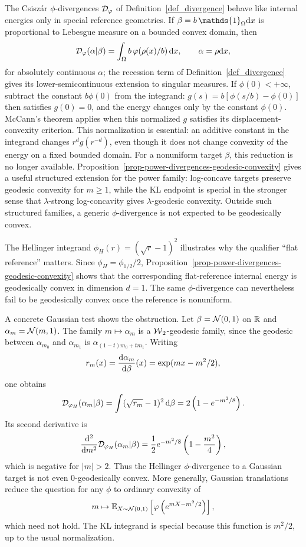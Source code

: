 \begin{rem}\label{rem-phi-divergence-geodesic-convexity}
	The Csisz\'ar \(\phi\)-divergences \(\mathcal{D}_\varphi\) of Definition~\ref{def_divergence} behave like internal energies only in special reference geometries. If \(\beta=b\,\mathds{1}_{\Omega}\d x\) is proportional to Lebesgue measure on a bounded convex domain, then
	\[
	\mathcal{D}_\varphi(\alpha|\beta)
	=
	\int_{\Omega} b\,\varphi(\rho(x)/b)\,\mathrm{d} x,
	\qquad \alpha=\rho\mathrm{d} x,
	\]
	for absolutely continuous \(\alpha\); the recession term of Definition~\ref{def_divergence} gives its lower-semicontinuous extension to singular measures. If $\phi(0)<+\infty$, subtract the constant $b\phi(0)$ from the integrand: $g(s)=b[\phi(s/b)-\phi(0)]$ then satisfies $g(0)=0$, and the energy changes only by the constant $\phi(0)$. McCann's theorem applies when this normalized $g$ satisfies its displacement-convexity criterion. This normalization is essential: an additive constant in the integrand changes $r^d g(r^{-d})$, even though it does not change convexity of the energy on a fixed bounded domain. For a nonuniform target \(\beta\), this reduction is no longer available. Proposition~\ref{prop-power-divergences-geodesic-convexity} gives a useful structured extension for the power family: log-concave targets preserve geodesic convexity for \(m\geq1\), while the KL endpoint is special in the stronger sense that \(\lambda\)-strong log-concavity gives \(\lambda\)-geodesic convexity. Outside such structured families, a generic \(\phi\)-divergence is not expected to be geodesically convex.

	The Hellinger integrand \(\phi_H(r)=(\sqrt r-1)^2\) illustrates why the qualifier ``flat reference'' matters. Since \(\phi_H=\phi_{1/2}/2\), Proposition~\ref{prop-power-divergences-geodesic-convexity} shows that the corresponding flat-reference internal energy is geodesically convex in dimension \(d=1\). The same \(\phi\)-divergence can nevertheless fail to be geodesically convex once the reference is nonuniform.

	A concrete Gaussian test shows the obstruction. Let \(\beta=\mathcal{N}(0,1)\) on \(\mathbb{R}\) and \(\alpha_m=\mathcal{N}(m,1)\). The family \(m\mapsto\alpha_m\) is a \(\operatorname{\mathcal{W}}_2\)-geodesic family, since the geodesic between \(\alpha_{m_0}\) and \(\alpha_{m_1}\) is \(\alpha_{(1-t)m_0+t m_1}\). Writing
	\[
		r_m(x)=\frac{\mathrm{d}\alpha_m}{\mathrm{d}\beta}(x)=\exp(mx-m^2/2),
	\]
	one obtains
	\[
		\mathcal{D}_{\varphi_H}(\alpha_m|\beta)
		=
		\int(\sqrt{r_m}-1)^2\,\mathrm{d}\beta
		=
		2\left(1-e^{-m^2/8}\right).
	\]
	Its second derivative is
	\[
		\frac{\mathrm{d}^2}{\mathrm{d} m^2}\mathcal{D}_{\varphi_H}(\alpha_m|\beta)
		=
		\frac12 e^{-m^2/8}\left(1-\frac{m^2}{4}\right),
	\]
	which is negative for \(|m|>2\). Thus the Hellinger \(\phi\)-divergence to a Gaussian target is not even \(0\)-geodesically convex. More generally, Gaussian translations reduce the question for any \(\phi\) to ordinary convexity of
	\[
		m\mapsto
		\mathbb{E}_{X\sim\mathcal{N}(0,1)}
		\left[\varphi\left(e^{mX-m^2/2}\right)\right],
	\]
	which need not hold. The KL integrand is special because this function is \(m^2/2\), up to the usual normalization.
\end{rem}
